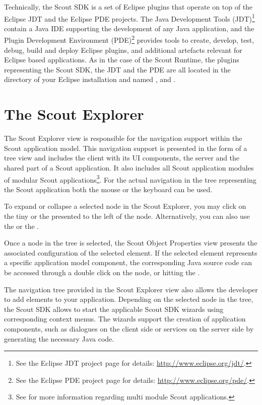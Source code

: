 \documentclass[a4paper,10pt,twoside]{book}
\begin{document}
Technically, the Scout SDK is a set of Eclipse plugins that operate on top of the Eclipse JDT and the Eclipse PDE projects.
The Java Development Tools (JDT)\footnote{
See the Eclipse JDT project page for details: \url{http://www.eclipse.org/jdt/}.
} 
contain a Java IDE supporting the development of any Java application, 
and the Plugin Development Environment (PDE)\footnote{
See the Eclipse PDE project page for details: \url{http://www.eclipse.org/pde/}.
}
provides tools to create, develop, test, debug, build and deploy Eclipse plugins, and additional artefacts relevant for Eclipse based applications. 
As in the case of the Scout Runtime, the plugins representing the Scout SDK, the JDT and the PDE are all located in the  directory of your Eclipse installation and named ,  and  . 

\section{The Scout Explorer}

The Scout Explorer view is responsible for the navigation support within the Scout application model. 
This navigation support is presented in the form of a tree view and includes the client with its UI components, the server and the shared part of a Scout application. 
It also includes all Scout application modules of modular Scout applications\footnote{
See  for more information regarding multi module Scout applications.
}.
For the actual navigation in the tree representing the Scout application both the mouse or the keyboard can be used. 

To expand or collapse a selected node in the Scout Explorer, you may click on the tiny  or the  presented to the left of the node.
Alternatively, you can also use the  or the .

Once a node in the tree is selected, the Scout Object Properties view presents the associated configuration of the selected element. 
If the selected element represents a specific application model component, the corresponding Java source code can be accessed through a double click on the node, or hitting the . 

The navigation tree provided in the Scout Explorer view also allows the developer to add elements to your application.
Depending on the selected node in the tree, the Scout SDK allows to start the applicable Scout SDK wizards using corresponding context menus. 
The wizards support the creation of application components, such as dialogues on the client side or services on the server side by generating the necessary Java code.
\end{document}
